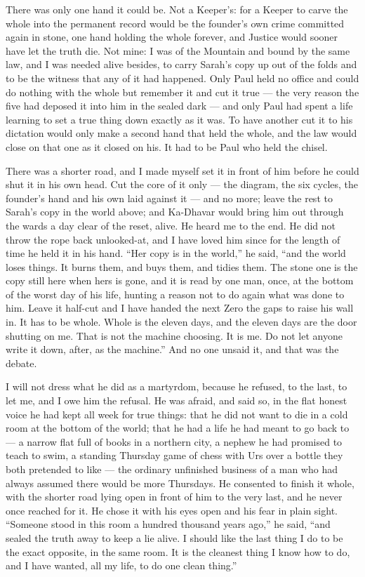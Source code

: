 There was only one hand it could be. Not a Keeper's: for a Keeper to carve the whole into the permanent record would be the founder's own crime committed again in stone, one hand holding the whole forever, and Justice would sooner have let the truth die. Not mine: I was of the Mountain and bound by the same law, and I was needed alive besides, to carry Sarah's copy up out of the folds and to be the witness that any of it had happened. Only Paul held no office and could do nothing with the whole but remember it and cut it true --- the very reason the five had deposed it into him in the sealed dark --- and only Paul had spent a life learning to set a true thing down exactly as it was. To have another cut it to his dictation would only make a second hand that held the whole, and the law would close on that one as it closed on his. It had to be Paul who held the chisel.\par

There was a shorter road, and I made myself set it in front of him before he could shut it in his own head. Cut the core of it only --- the diagram, the six cycles, the founder's hand and his own laid against it --- and no more; leave the rest to Sarah's copy in the world above; and Ka-Dhavar would bring him out through the wards a day clear of the reset, alive. He heard me to the end. He did not throw the rope back unlooked-at, and I have loved him since for the length of time he held it in his hand. ``Her copy is in the world,'' he said, ``and the world loses things. It burns them, and buys them, and tidies them. The stone one is the copy still here when hers is gone, and it is read by one man, once, at the bottom of the worst day of his life, hunting a reason not to do again what was done to him. Leave it half-cut and I have handed the next Zero the gaps to raise his wall in. It has to be whole. Whole is the eleven days, and the eleven days are the door shutting on me. That is not the machine choosing. It is me. Do not let anyone write it down, after, as the machine.'' And no one unsaid it, and that was the debate.\par

I will not dress what he did as a martyrdom, because he refused, to the last, to let me, and I owe him the refusal. He was afraid, and said so, in the flat honest voice he had kept all week for true things: that he did not want to die in a cold room at the bottom of the world; that he had a life he had meant to go back to --- a narrow flat full of books in a northern city, a nephew he had promised to teach to swim, a standing Thursday game of chess with Urs over a bottle they both pretended to like --- the ordinary unfinished business of a man who had always assumed there would be more Thursdays. He consented to finish it whole, with the shorter road lying open in front of him to the very last, and he never once reached for it. He chose it with his eyes open and his fear in plain sight. ``Someone stood in this room a hundred thousand years ago,'' he said, ``and sealed the truth away to keep a lie alive. I should like the last thing I do to be the exact opposite, in the same room. It is the cleanest thing I know how to do, and I have wanted, all my life, to do one clean thing.''\par


